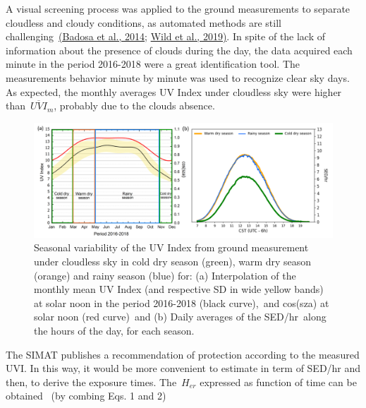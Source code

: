 \documentclass[10pt]{article}
\begin{document}
A visual screening process was applied to the ground measurements to
separate cloudless and cloudy conditions, as automated methods are still
challenging~\hyperref[csl:67]{(Badosa et al., 2014}; \hyperref[csl:68]{Wild et al., 2019)}. In spite of the lack of information
about the presence of clouds during the day, the data acquired each
minute in the period 2016-2018 were a great identification tool. The
measurements behavior minute by minute was used to recognize clear sky
days. As expected, the monthly averages UV Index under cloudless sky
were higher than~\(\overline{UVI}_m\), probably due to the clouds absence.
\begin{figure}[H]
\begin{center}
\includegraphics[width=0.98\columnwidth]{figures/season_graphics}
\caption{{Seasonal variability of the UV Index from ground measurement under
cloudless sky in cold dry season (green), warm dry season (orange) and
rainy season (blue) for: (a) Interpolation of the monthly mean UV Index
(and respective SD in wide yellow bands) at solar noon in the period
2016-2018 (black curve),~and cos(sza) at solar noon (red curve)~and (b)
Daily averages of the SED/hr~along the hours of the day, for each
season.~
{\label{590688}}%
}}
\end{center}
\end{figure}

The SIMAT publishes a recommendation of protection according to the
measured UVI. In this way, it would be more convenient to estimate in
term of SED/hr and then, to derive the exposure times.
The~\(H_{er}\) expressed as function of time can be obtained~
(by combing Eqs. 1 and 2)
\end{document}
